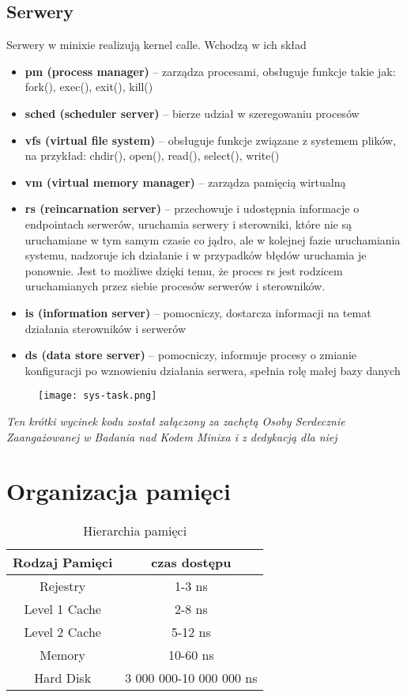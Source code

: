 \documentclass[12pt, a4paper, polish, openany]{book}
\begin{document}
\subsection{Serwery}
Serwery w minixie realizują kernel calle. Wchodzą w ich skład
\begin{itemize}
  \item \textbf{pm (process manager)} – zarządza procesami, obsługuje funkcje takie jak: fork(), exec(), exit(), kill()
  \item \textbf{sched (scheduler server)} – bierze udział w szeregowaniu procesów
  \item \textbf{vfs (virtual file system)} – obsługuje funkcje związane z systemem plików, na przykład: chdir(), open(), read(), select(), write()
  \item \textbf{vm (virtual memory manager)} – zarządza pamięcią wirtualną
  \item \textbf{rs (reincarnation server)} – przechowuje i udostępnia informacje o endpointach serwerów, uruchamia serwery i sterowniki, które nie są uruchamiane w tym samym czasie co jądro, ale w kolejnej fazie uruchamiania systemu, nadzoruje ich działanie i w przypadków błędów uruchamia je ponownie. Jest to możliwe dzięki temu, że proces rs jest rodzicem uruchamianych przez siebie procesów serwerów i sterowników.
  \item \textbf{is (information server)} – pomocniczy, dostarcza informacji na temat działania sterowników i serwerów
  \item \textbf{ds (data store server)} – pomocniczy, informuje procesy o zmianie konfiguracji po wznowieniu działania serwera, spełnia rolę małej bazy danych
\end{itemize}
\begin{figure}[H]
  \centering
  \texttt{[image: sys-task.png]}
\end{figure}
\begin{center}
  \textit{\small Ten krótki wycinek kodu został załączony za zachętą Osoby Serdecznie Zaangażowanej w Badania nad Kodem Minixa i z dedykacją dla niej}
\end{center}

\section{Organizacja pamięci}
\begin{table}[H]
  \centering
  \begin{tabular}{c|c}
    Rodzaj Pamięci & czas dostępu \\
    \hline
    Rejestry & 1-3 ns\\
    Level 1 Cache & 2-8 ns\\
    Level 2 Cache & 5-12 ns\\
    Memory & 10-60 ns\\
    Hard Disk & 3 000 000-10 000 000 ns
  \end{tabular}
  \caption{Hierarchia pamięci}
\end{table}
\end{document}
